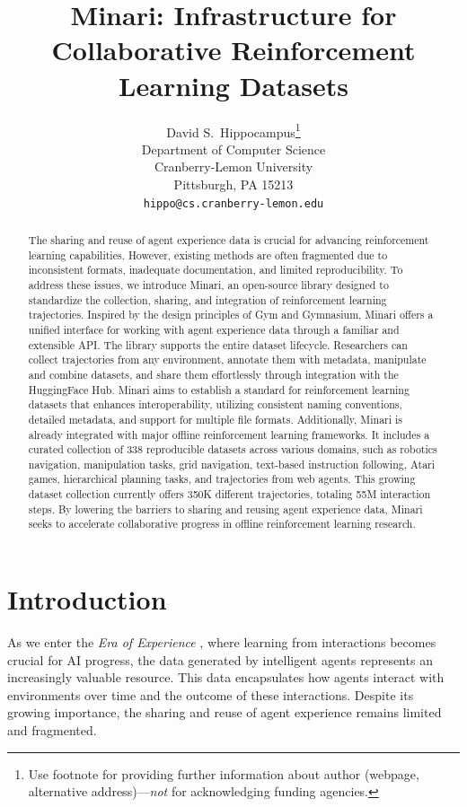 \documentclass{article}
\title{Minari: Infrastructure for Collaborative Reinforcement Learning Datasets}
\author{%
  David S.~Hippocampus\thanks{Use footnote for providing further information
    about author (webpage, alternative address)---\emph{not} for acknowledging
    funding agencies.} \\
  Department of Computer Science\\
  Cranberry-Lemon University\\
  Pittsburgh, PA 15213 \\
  \texttt{hippo@cs.cranberry-lemon.edu} \\
}
\begin{document}
\maketitle

\begin{abstract}
The sharing and reuse of agent experience data is crucial for advancing reinforcement learning capabilities. However, existing methods are often fragmented due to inconsistent formats, inadequate documentation, and limited reproducibility. 
To address these issues, we introduce Minari, an open-source library designed to standardize the collection, sharing, and integration of reinforcement learning trajectories. Inspired by the design principles of Gym and Gymnasium, Minari offers a unified interface for working with agent experience data through a familiar and extensible API.
The library supports the entire dataset lifecycle. Researchers can collect trajectories from any environment, annotate them with metadata, manipulate and combine datasets, and share them effortlessly through integration with the HuggingFace Hub. Minari aims to establish a standard for reinforcement learning datasets that enhances interoperability, utilizing consistent naming conventions, detailed metadata, and support for multiple file formats.
Additionally, Minari is already integrated with major offline reinforcement learning frameworks. It includes a curated collection of 338 reproducible datasets across various domains, such as robotics navigation, manipulation tasks, grid navigation, text-based instruction following, Atari games, hierarchical planning tasks, and trajectories from web agents. This growing dataset collection currently offers 350K different trajectories, totaling 55M interaction steps.
By lowering the barriers to sharing and reusing agent experience data, Minari seeks to accelerate collaborative progress in offline reinforcement learning research.
\end{abstract}

\section{Introduction}

As we enter the \textit{Era of Experience} \cite{experience-era}, where learning from interactions becomes crucial for AI progress, the data generated by intelligent agents represents an increasingly valuable resource. This data encapsulates how agents interact with environments over time and the outcome of these interactions. Despite its growing importance, the sharing and reuse of agent experience remains limited and fragmented.
\end{document}
